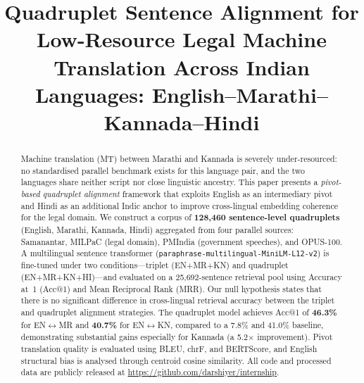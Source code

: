 \documentclass[conference,letterpaper]{IEEEtran}
\begin{document}
\title{Quadruplet Sentence Alignment for Low-Resource Legal Machine
Translation Across Indian Languages: English--Marathi--Kannada--Hindi}

\author{
}

\maketitle
\thispagestyle{plain}
\pagestyle{plain}

\begin{abstract}
Machine translation (MT) between Marathi and Kannada is severely
under-resourced: no standardised parallel benchmark exists for this
language pair, and the two languages share neither script nor close
linguistic ancestry. This paper presents a \textit{pivot-based quadruplet
alignment} framework that exploits English as an intermediary pivot and
Hindi as an additional Indic anchor to improve cross-lingual embedding
coherence for the legal domain. We construct a corpus of
\textbf{128,460 sentence-level quadruplets} (English, Marathi, Kannada,
Hindi) aggregated from four parallel sources: Samanantar, MILPaC (legal
domain), PMIndia (government speeches), and OPUS-100. A multilingual
sentence transformer (\texttt{paraphrase-multilingual-MiniLM-L12-v2}) is
fine-tuned under two conditions---triplet (EN+MR+KN) and quadruplet
(EN+MR+KN+HI)---and evaluated on a 25,692-sentence retrieval pool using
Accuracy at~1 (Acc@1) and Mean Reciprocal Rank (MRR). Our null hypothesis
states that there is no significant difference in cross-lingual retrieval
accuracy between the triplet and quadruplet alignment strategies. The
quadruplet model achieves Acc@1 of \textbf{46.3\%} for EN$\leftrightarrow$MR
and \textbf{40.7\%} for EN$\leftrightarrow$KN, compared to a 7.8\% and
41.0\% baseline, demonstrating substantial gains especially for Kannada
(a 5.2$\times$ improvement). Pivot translation quality is evaluated using
BLEU, chrF, and BERTScore, and English structural bias is analysed through
centroid cosine similarity. All code and processed data are publicly released
at \url{https://github.com/darshiyer/internship}.
\end{abstract}
\end{document}
